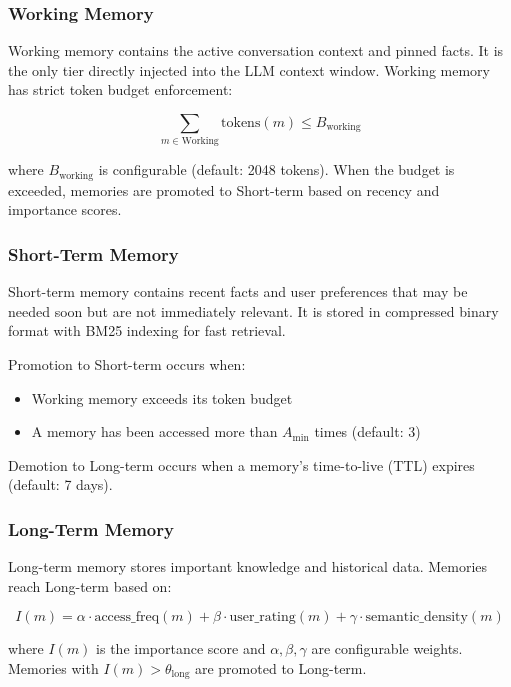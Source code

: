 \subsubsection{Working Memory}

Working memory contains the active conversation context and pinned facts. It is the only tier directly injected into the LLM context window. Working memory has strict token budget enforcement:

\begin{equation}
\sum_{m \in \text{Working}} \text{tokens}(m) \leq B_{\text{working}}
\end{equation}

where $B_{\text{working}}$ is configurable (default: 2048 tokens). When the budget is exceeded, memories are promoted to Short-term based on recency and importance scores.

\subsubsection{Short-Term Memory}

Short-term memory contains recent facts and user preferences that may be needed soon but are not immediately relevant. It is stored in compressed binary format with BM25 indexing for fast retrieval.

Promotion to Short-term occurs when:
\begin{itemize}
    \item Working memory exceeds its token budget
    \item A memory has been accessed more than $A_{\min}$ times (default: 3)
\end{itemize}

Demotion to Long-term occurs when a memory's time-to-live (TTL) expires (default: 7 days).

\subsubsection{Long-Term Memory}

Long-term memory stores important knowledge and historical data. Memories reach Long-term based on:

\begin{equation}
I(m) = \alpha \cdot \text{access\_freq}(m) + \beta \cdot \text{user\_rating}(m) + \gamma \cdot \text{semantic\_density}(m)
\end{equation}

where $I(m)$ is the importance score and $\alpha, \beta, \gamma$ are configurable weights. Memories with $I(m) > \theta_{\text{long}}$ are promoted to Long-term.

